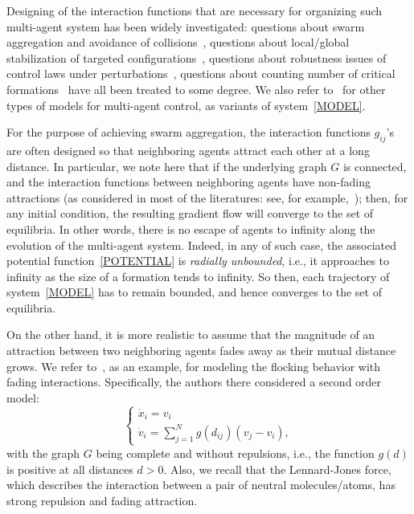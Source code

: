 \documentclass[10pt,twocolumn,twoside]{IEEEtran}
\renewcommand{\(}{\left (}
\renewcommand{\)}{\right )}
\renewcommand{\;}{\,;\,}
\begin{document}
Designing of the interaction functions that are necessary for organizing such multi-agent system has been widely investigated: questions about swarm aggregation and avoidance of collisions~\cite{GP,chu2003self,XC2014ACC}, questions about local/global stabilization of targeted configurations~\cite{chu2003self,krick2009,dimarogonas2008stability,xudongchen2015CDCtriangulatedformationcontrol,zhiyongsun2015ECC}, questions about robustness issues of control laws under perturbations~\cite{AB2012CDC,sun2014CDC,USZB,mou2014CDC}, questions about counting number of critical formations~\cite{BDO2014CT,UH2013E}  have all been treated to some degree. 
We also refer to~\cite{xudongchen2015CDCformationcontroltimevaryinggraph,XC2014CDC,JB2006cdc,cao2008control,baillieul2007combinatorial,AB2013TAC,AL2014ECC,lin2014distributed,chen2015decentralized} for other types of models for multi-agent control, as variants of system~\eqref{MODEL}. 

For the purpose of achieving swarm aggregation, the interaction functions $g_{ij}$'s are often designed so that neighboring agents 
attract each other at a long distance. In particular, we note here that if the underlying graph $G$ is connected, and the interaction functions between neighboring agents have  non-fading attractions (as considered in most of the literatures: see, for example,~\cite{GP,chu2003self,zhiyongsun2015ECC,krick2009,dimarogonas2008stability}); then, for any initial condition, the resulting gradient flow will converge to the set of equilibria. In other words, there is no escape of agents to infinity along the evolution of the multi-agent system. Indeed, in any of such case, the  associated potential function~\eqref{POTENTIAL} is {\it radially unbounded}, i.e., it approaches to infinity as the size of a formation tends to infinity. So then, each trajectory  of system~\eqref{MODEL} has to remain bounded, and hence converges to the set of equilibria.  

On the other hand, it is more realistic  to assume that the magnitude of an attraction between two neighboring agents fades away as their mutual distance grows. We refer to~\cite{cucker2007emergent}, as an example, for modeling the flocking behavior with fading interactions. Specifically, the authors there considered a second order model: 
$$
\left\{
\begin{array}{l}
\dot x_i = v_i\\
\dot v_i = \sum^N_{j = 1} g(d_{ij}) (v_j - v_i),  
\end{array}
\right.
$$
with the graph $G$ being complete and without repulsions, i.e., the function $g(d)$ is positive at all distances $d>0$.  
Also, we recall that the Lennard-Jones force, which describes the interaction between a pair of neutral molecules/atoms, has strong repulsion and fading attraction. 
\end{document}
